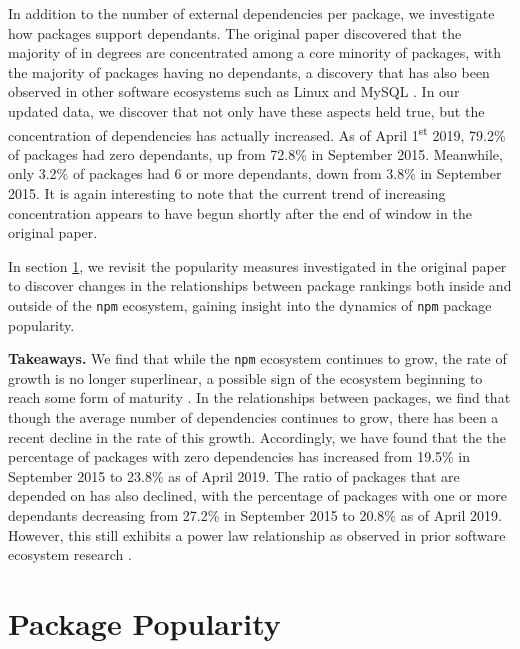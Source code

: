 \documentclass[10pt,conference]{IEEEtran}
\def\code#1{\texttt{#1}}
\begin{document}
In addition to the number of external dependencies per package, 
we investigate how packages support dependants. The original paper 
discovered that the majority of in degrees are concentrated among a core 
minority of packages, with the majority of packages having no dependants,
a discovery that has also been observed in other software ecosystems such
as Linux and MySQL \cite{Myers:2003}. In our updated data, we discover 
that not only have these aspects held true, but the concentration of 
dependencies has actually increased. As of April 1\textsuperscript{st} 2019, 79.2\% of packages
had zero dependants, up from 72.8\% in September 2015. Meanwhile, only 3.2\% of packages
had 6 or more dependants, down from 3.8\% in September 2015. It is again interesting to note
that the current trend of increasing concentration appears to have begun shortly after the end of window in the original
paper.

In section \ref{popularity}, we revisit the popularity measures
investigated in the original paper \cite{Wittern:2016} to discover
changes in the relationships between package rankings
both inside and outside of the \code{npm} ecosystem,
gaining insight into the dynamics of \code{npm} package popularity.

\textbf{Takeaways.} We find that while the \code{npm} ecosystem
continues to grow, the rate of growth is no longer superlinear, 
a possible sign of the ecosystem beginning to reach some form of maturity \cite{Alves:2011}.
In the relationships between packages, we find that though the average number
of dependencies continues to grow, there has been a recent decline in the
rate of this growth. Accordingly, we have found that the the percentage of packages with zero dependencies has 
increased from 19.5\% in September 2015 to 23.8\% as of April 2019. The ratio of packages that are depended on has
also declined, with the percentage of packages with
one or more dependants decreasing from 27.2\% in September 2015 to 20.8\%
as of April 2019. However, this still exhibits a power law relationship as observed
in prior software ecosystem research \cite{Wittern:2016, Myers:2003, Louridas:2008}.


\section{Package Popularity}\label{popularity}
\end{document}
